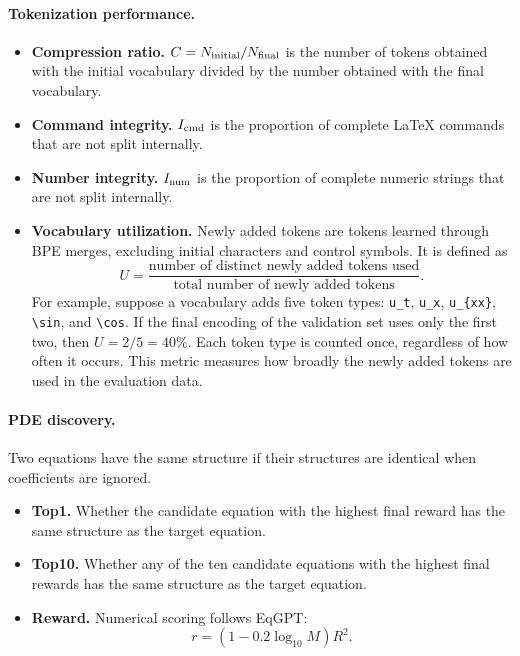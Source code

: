 \documentclass[11pt,letterpaper]{article}
\begin{document}
\paragraph{Tokenization performance.}
\begin{itemize}\setlength{\itemsep}{2pt}\setlength{\parsep}{0pt}
\item \textbf{Compression ratio.} $C=N_{\rm initial}/N_{\rm final}$ is the number of tokens obtained with the initial vocabulary divided by the number obtained with the final vocabulary.
\item \textbf{Command integrity.} $I_{\rm cmd}$ is the proportion of complete LaTeX commands that are not split internally.
\item \textbf{Number integrity.} $I_{\rm num}$ is the proportion of complete numeric strings that are not split internally.
\item \textbf{Vocabulary utilization.} Newly added tokens are tokens learned through BPE merges, excluding initial characters and control symbols. It is defined as
\begin{equation}
 U=\frac{\text{number of distinct newly added tokens used}}{\text{total number of newly added tokens}}.
\end{equation}
For example, suppose a vocabulary adds five token types: \verb|u_t|, \verb|u_x|, \verb|u_{xx}|, \verb|\sin|, and \verb|\cos|. If the final encoding of the validation set uses only the first two, then $U=2/5=40\%$. Each token type is counted once, regardless of how often it occurs. This metric measures how broadly the newly added tokens are used in the evaluation data.

\end{itemize}

\paragraph{PDE discovery.}
Two equations have the same structure if their structures are identical when coefficients are ignored.
\begin{itemize}\setlength{\itemsep}{2pt}\setlength{\parsep}{0pt}
\item \textbf{Top1.} Whether the candidate equation with the highest final reward has the same structure as the target equation.
\item \textbf{Top10.} Whether any of the ten candidate equations with the highest final rewards has the same structure as the target equation.
\item \textbf{Reward.} Numerical scoring follows EqGPT:
\begin{equation}\label{eq:reward}
 r=\left(1-0.2\log_{10}M\right)R^2.
\end{equation}
\end{itemize}
\end{document}
